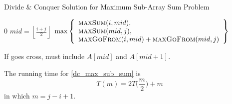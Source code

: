 \begin{algorithm}[H]
    \caption{Divide \& Conquer Solution for Maximum Sub-Array Sum Problem}\label{dc_max_sub_sum}
\begin{algorithmic}[1]
    \Return $0$
  \EndIf
  \State $mid = \left\lfloor \frac{i + j}{2} \right\rfloor$
  \Return $\max\left\{
      \begin{array}{l}
          \textsc{maxSum} (i, mid), \\
          \textsc{maxSum} (mid, j), \\
          \textsc{maxGoFrom} (i, mid) + \textsc{maxGoFrom} (mid, j)
      \end{array}
  \right\}$
\EndProcedure
\end{algorithmic}
\end{algorithm}

If goes cross, must include $A[mid]$ and $A[mid+1]$.

The running time for \cref{dc_max_sub_sum} is
\[T(m) = 2T\big(\frac{m}{2}\big) + m\]
in which $m = j - i + 1$.



